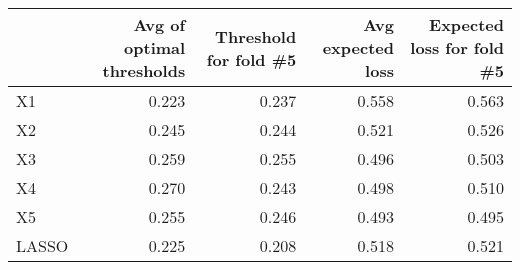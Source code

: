 
\begin{tabular}{lrrrr}
\toprule
  & Avg of optimal thresholds & Threshold for fold \#5 & Avg expected loss & Expected loss for fold \#5\\
\midrule
X1 & 0.223 & 0.237 & 0.558 & 0.563\\
X2 & 0.245 & 0.244 & 0.521 & 0.526\\
X3 & 0.259 & 0.255 & 0.496 & 0.503\\
X4 & 0.270 & 0.243 & 0.498 & 0.510\\
X5 & 0.255 & 0.246 & 0.493 & 0.495\\
LASSO & 0.225 & 0.208 & 0.518 & 0.521\\
\bottomrule
\end{tabular}